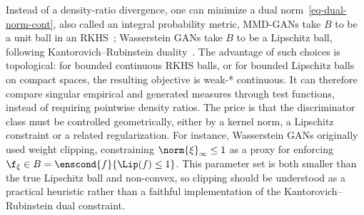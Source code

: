 Instead of a density-ratio divergence, one can minimize a dual norm~\eqref{eq-dual-norm-cont}, also called an integral probability metric,
MMD-GANs take $B$ to be a unit ball in an RKHS~\cite{MMD-GAN}; Wasserstein GANs take $B$ to be a Lipschitz ball, following Kantorovich--Rubinstein duality~\cite{WassersteinGAN,FrognerNIPS}. The advantage of such choices is topological: for bounded continuous RKHS balls, or for bounded Lipschitz balls on compact spaces, the resulting objective is weak-* continuous. It can therefore compare singular empirical and generated measures through test functions, instead of requiring pointwise density ratios. The price is that the discriminator class must be controlled geometrically, either by a kernel norm, a Lipschitz constraint or a related regularization.
%
	For instance, Wasserstein GANs originally used weight clipping, constraining $\norm{\xi}_\infty \leq 1$ as a proxy for enforcing $\f_\xi \in B = \enscond{f}{\Lip(f) \leq 1}$. This parameter set is both smaller than the true Lipschitz ball and non-convex, so clipping should be understood as a practical heuristic rather than a faithful implementation of the Kantorovich--Rubinstein dual constraint.
